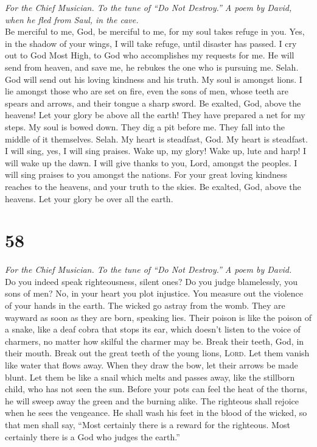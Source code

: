 \emph{For the Chief Musician. To the tune of ``Do Not Destroy.'' A poem
by David, when he fled from Saul, in the cave.}\\
 Be merciful to me, God, be merciful to me, for my soul
takes refuge in you. Yes, in the shadow of your wings, I will take
refuge, until disaster has passed.  I cry out to God Most
High, to God who accomplishes my requests for me.  He will
send from heaven, and save me, he rebukes the one who is pursuing me.
Selah. God will send out his loving kindness and his truth.
 My soul is amongst lions. I lie amongst those who are set
on fire, even the sons of men, whose teeth are spears and arrows, and
their tongue a sharp sword.  Be exalted, God, above the
heavens! Let your glory be above all the earth!  They have
prepared a net for my steps. My soul is bowed down. They dig a pit
before me. They fall into the middle of it themselves. Selah.
 My heart is steadfast, God. My heart is steadfast. I will
sing, yes, I will sing praises.  Wake up, my glory! Wake
up, lute and harp! I will wake up the dawn.  I will give
thanks to you, Lord, amongst the peoples. I will sing praises to you
amongst the nations.  For your great loving kindness
reaches to the heavens, and your truth to the skies.  Be
exalted, God, above the heavens. Let your glory be over all the earth.

\hypertarget{section-57}{%
\section{58}\label{section-57}}

\emph{For the Chief Musician. To the tune of ``Do Not Destroy.'' A poem
by David.}\\
 Do you indeed speak righteousness, silent ones? Do you
judge blamelessly, you sons of men?  No, in your heart you
plot injustice. You measure out the violence of your hands in the earth.
 The wicked go astray from the womb. They are wayward as
soon as they are born, speaking lies.  Their poison is
like the poison of a snake, like a deaf cobra that stops its ear,
 which doesn't listen to the voice of charmers, no matter
how skilful the charmer may be.  Break their teeth, God,
in their mouth. Break out the great teeth of the young lions,
\textsc{Lord}.  Let them vanish like water that flows
away. When they draw the bow, let their arrows be made blunt.
 Let them be like a snail which melts and passes away,
like the stillborn child, who has not seen the sun. 
Before your pots can feel the heat of the thorns, he will sweep away the
green and the burning alike.  The righteous shall rejoice
when he sees the vengeance. He shall wash his feet in the blood of the
wicked,  so that men shall say, ``Most certainly there is
a reward for the righteous. Most certainly there is a God who judges the
earth.''

